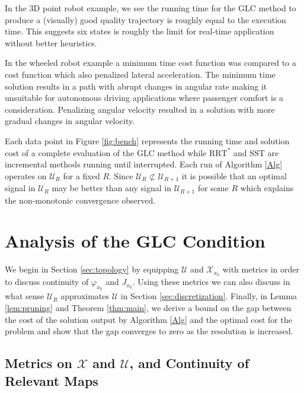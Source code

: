 \documentclass{llncs}
\newcommand{\GLC}{\ensuremath{\mathrm{GLC}}\xspace}
\newcommand{\RRTs}{\ensuremath{\mathrm{RRT}^*}\xspace}
\newcommand{\SST}{\ensuremath{\mathrm{SST}}\xspace}
\begin{document}
%
In the 3D point robot example, we see the running time for the \GLC method to produce a (visually) good quality trajectory is roughly equal to the execution time.
%
This suggests six states is roughly the limit for real-time application without better heuristics. 
%

%
In the wheeled robot example a minimum time cost function was compared to a cost function which also penalized lateral acceleration.
%
The minimum time solution results in a path with abrupt changes in angular rate making it unsuitable for autonomous driving applications where passenger comfort is a consideration. 
%
Penalizing angular velocity resulted in a solution with more gradual changes in angular velocity.

Each data point in Figure \ref{fig:bench} represents the running time and solution cost of a complete evaluation of the \GLC method while \RRTs and \SST are incremental methods running until  interrupted. 
%	
Each run of Algorithm \ref{Alg} operates on $\mathcal{U}_R$ for a fixed $R$. Since $\mathcal{U}_{R}\not\subset\mathcal{U}_{R+1}$ it is possible that an optimal signal in $\mathcal{U}_R$ may be better than any signal in $\mathcal{U}_{R+1}$ for some $R$ which explains the non-monotonic convergence observed.
%
\section{\label{sec:Justification}Analysis of the GLC Condition}


We begin in Section \ref{sec:topology} by equipping $\mathcal{U}$ and $\mathcal{X}_{x_0}$ with metrics in order to discuss continuity of $\varphi_{x_0}$ and $J_{x_0}$. 
%
Using these metrics we can also discuss in what sense $\mathcal{U}_R$ approximates $\mathcal{U}$ in Section \ref{sec:discretization}. 
%
Finally, in Lemma \ref{lem:pruning} and Theorem \ref{thm:main}, we derive a bound on the gap between the cost of the solution output by Algorithm \ref{Alg} and the optimal cost for the problem and show that the gap converges to zero as the resolution is increased.


\subsection{Metrics on $\mathcal{X}$ and $\mathcal{U}$, and Continuity of Relevant
Maps \label{sec:topology}}
\end{document}
